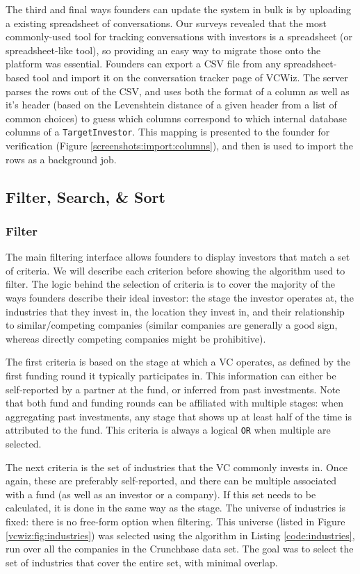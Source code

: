 The third and final ways founders can update the system in bulk is by uploading a existing spreadsheet of conversations. Our surveys revealed that the most commonly-used tool for tracking conversations with investors is a spreadsheet (or spreadsheet-like tool), so providing an easy way to migrate those onto the platform was essential. Founders can export a CSV file from any spreadsheet-based tool and import it on the conversation tracker page of VCWiz. The server parses the rows out of the CSV, and uses both the format of a column as well as it's header (based on the Levenshtein distance \cite{1966SPhD...10..707L} of a given header from a list of common choices) to guess which columns correspond to which internal database columns of a \texttt{TargetInvestor}. This mapping is presented to the founder for verification (Figure \ref{screenshots:import:columns}), and then is used to import the rows as a background job.

\subsection{Filter, Search, \& Sort}
\label{ch4:filtering}

\subsubsection{Filter}

The main filtering interface allows founders to display investors that match a set of criteria. We will describe each criterion before showing the algorithm used to filter. The logic behind the selection of criteria is to cover the majority of the ways founders describe their ideal investor: the stage the investor operates at, the industries that they invest in, the location they invest in, and their relationship to similar/competing companies (similar companies are generally a good sign, whereas directly competing companies might be prohibitive).

The first criteria is based on the stage at which a VC operates, as defined by the first funding round it typically participates in. This information can either be self-reported by a partner at the fund, or inferred from past investments. Note that both fund and funding rounds can be affiliated with multiple stages: when aggregating past investments, any stage that shows up at least half of the time is attributed to the fund. This criteria is always a logical \texttt{OR} when multiple are selected.

The next criteria is the set of industries that the VC commonly invests in. Once again, these are preferably self-reported, and there can be multiple associated with a fund (as well as an investor or a company). If this set needs to be calculated, it is done in the same way as the stage. The universe of industries is fixed: there is no free-form option when filtering. This universe (listed in Figure \ref{vcwiz:fig:industries}) was selected using the algorithm in Listing \ref{code:industries}, run over all the companies in the Crunchbase data set. The goal was to select the set of industries that cover the entire set, with minimal overlap.

